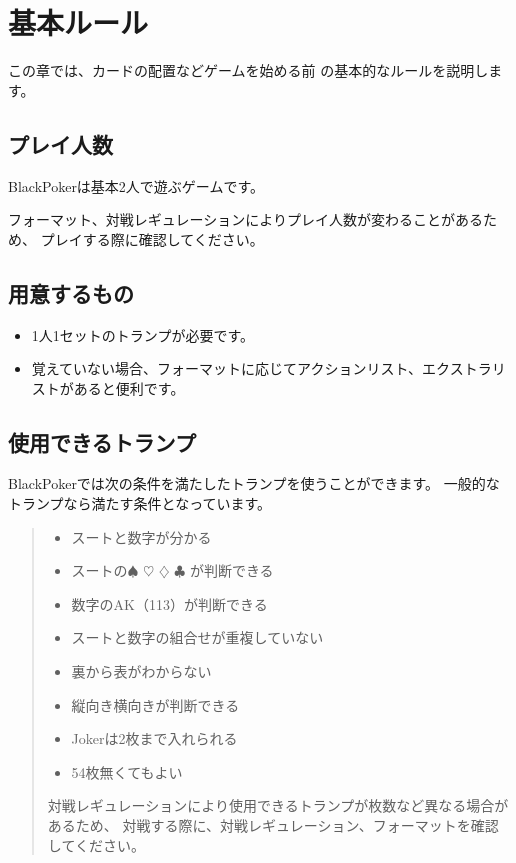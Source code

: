 \documentclass[letterpaper,10pt,dvipdfmx]{sphinxmanual}
\begin{document}
\section{基本ルール}
\label{\detokenize{common/01-base:id1}}\label{\detokenize{common/01-base::doc}}
この章では、カードの配置などゲームを始める前
の基本的なルールを説明します。


\subsection{プレイ人数}
\label{\detokenize{common/01-base:id2}}
BlackPokerは基本2人で遊ぶゲームです。

フォーマット、対戦レギュレーションによりプレイ人数が変わることがあるため、
プレイする際に確認してください。


\subsection{用意するもの}
\label{\detokenize{common/01-base:id3}}\begin{itemize}
\item {} 
1人1セットのトランプが必要です。

\item {} 
覚えていない場合、フォーマットに応じてアクションリスト、エクストラリストがあると便利です。

\end{itemize}


\subsection{使用できるトランプ}
\label{\detokenize{common/01-base:id4}}
BlackPokerでは次の条件を満たしたトランプを使うことができます。
一般的なトランプなら満たす条件となっています。
\begin{quote}
\begin{itemize}
\item {} 
スートと数字が分かる

\item {} 
スートの{\normalsize $\spadesuit$} {\normalsize $\heartsuit$} {\normalsize $\diamondsuit$} {\normalsize $\clubsuit$} が判断できる

\item {} 
数字のA\sphinxhyphen{}K（1\sphinxhyphen{}13）が判断できる

\item {} 
スートと数字の組合せが重複していない

\item {} 
裏から表がわからない

\item {} 
縦向き横向きが判断できる

\item {} 
Jokerは2枚まで入れられる

\item {} 
54枚無くてもよい

\end{itemize}

対戦レギュレーションにより使用できるトランプが枚数など異なる場合があるため、
対戦する際に、対戦レギュレーション、フォーマットを確認してください。
\end{quote}
\end{document}
